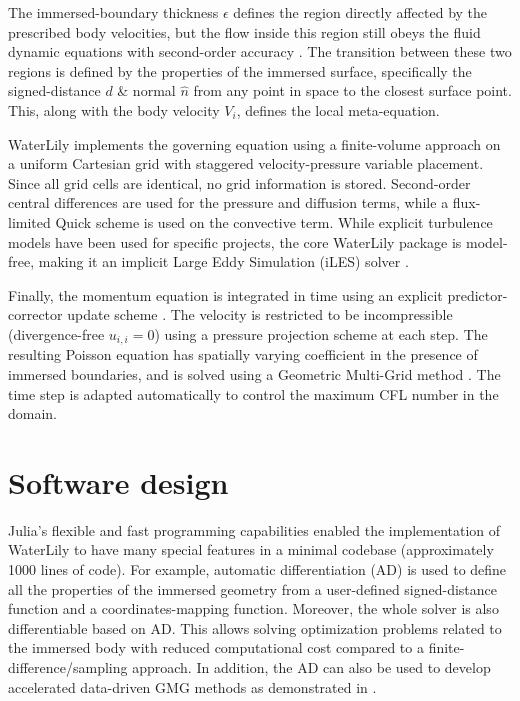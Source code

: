 \documentclass[final,3p,times]{elsarticle}
\begin{document}
The immersed-boundary thickness $\epsilon$ defines the region directly affected by the prescribed body velocities, but the flow inside this region still obeys the fluid dynamic equations with second-order accuracy \cite{Maertens2014}. The transition between these two regions is defined by the properties of the immersed surface, specifically the signed-distance $d$ \& normal $\hat n$ from any point in space to the closest surface point. This, along with the body velocity $V_i$, defines the local meta-equation.

WaterLily implements the governing equation using a finite-volume approach on a uniform Cartesian grid with staggered velocity-pressure variable placement. Since all grid cells are identical, no grid information is stored. Second-order central differences are used for the pressure and diffusion terms, while a flux-limited Quick scheme is used on the convective term. While explicit turbulence models have been used for specific projects, the core WaterLily package is model-free, making it an implicit Large Eddy Simulation (iLES) solver \cite{Margolin2006}.

Finally, the momentum equation is integrated in time using an explicit predictor-corrector update scheme \cite{Lauber2022}. The velocity is restricted to be incompressible (divergence-free $u_{i,i}=0$) using a pressure projection scheme at each step. The resulting Poisson equation has spatially varying coefficient in the presence of immersed boundaries, and is solved using a Geometric Multi-Grid method \cite{Weymouth2022}. The time step is adapted automatically to control the maximum CFL number in the domain.

\section{Software design}\label{sec:software_design}

Julia’s flexible and fast programming capabilities enabled the implementation of WaterLily to have many special features in a minimal codebase (approximately 1000 lines of code). For example, automatic differentiation (AD) is used to define all the properties of the immersed geometry from a user-defined signed-distance function and a coordinates-mapping function. Moreover, the whole solver is also differentiable based on AD. This allows solving optimization problems related to the immersed body with reduced computational cost compared to a finite-difference/sampling approach. In addition, the AD can also be used to develop accelerated data-driven GMG methods as demonstrated in \cite{Weymouth2022}.
\end{document}
